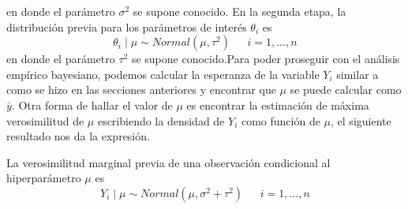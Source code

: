 en donde el parámetro $\sigma^2$ se supone conocido. En la segunda etapa, la distribución previa para los parámetros de interés $\theta_i$ es
\begin{equation*}
\theta_i \mid \mu \sim Normal(\mu, \tau^2) \ \ \ \ \ \ \ i=1,\ldots,n
\end{equation*}
en donde el parámetro $\tau^2$ se supone conocido.Para poder proseguir con el análisis empírico bayesiano, podemos calcular la esperanza de la variable $Y_i$ similar a como se hizo en las secciones anteriores y encontrar que $\mu$ se puede calcular como $\bar{y}$. Otra forma de hallar el valor de $\mu$ es encontrar la estimación de máxima verosimilitud de $\mu$ escribiendo la densidad de $Y_i$ como función de $\mu$, el siguiente resultado nos da la expresión.

\begin{Res}
La verosimilitud marginal previa de una observación condicional al hiperparámetro $\mu$ es
\begin{equation*}
Y_i \mid \mu\sim Normal(\mu,\sigma^2+ \tau^2) \ \ \ \ \ \ \ i=1,\ldots,n
\end{equation*}
\end{Res}

